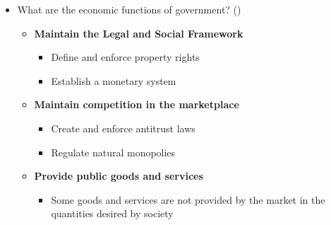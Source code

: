 \documentclass[
  ignorenonframetext,
]{beamer}
\providecommand{\tightlist}{%
  \setlength{\itemsep}{0pt}\setlength{\parskip}{0pt}}\usepackage{longtable,booktabs,array}
\begin{document}
\begin{frame}{}
\label{section-2}
\begin{itemize}
\item
  What are the economic functions of government?
  ()

  \begin{itemize}
  \item
    \textbf{Maintain the Legal and Social Framework}

    \begin{itemize}
    \tightlist
    \item
      Define and enforce property rights
    \item
      Establish a monetary system
    \end{itemize}
  \item
    \textbf{Maintain competition in the marketplace}

    \begin{itemize}
    \tightlist
    \item
      Create and enforce antitrust laws
    \item
      Regulate natural monopolies
    \end{itemize}
  \item
    \textbf{Provide public goods and services}

    \begin{itemize}
    \tightlist
    \item
      Some goods and services are not provided by the market in the
      quantities desired by society
    \end{itemize}
  \end{itemize}
\end{itemize}
\end{frame}
\end{document}
